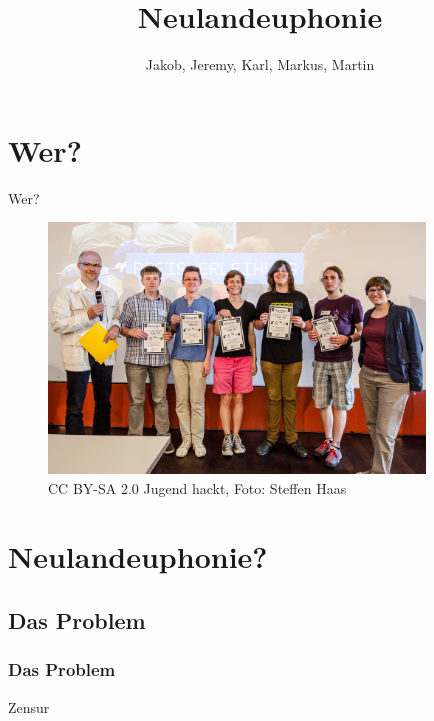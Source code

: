 \documentclass [xcolor=dvipsnames] {beamer}
\title {\sc Neulandeuphonie}
\author {Jakob, Jeremy, Karl, Markus, Martin}
\begin{document}
\begin{frame}
	\titlepage
\end{frame}

\begin{frame}
	\tableofcontents
\end{frame}

\section{Wer?}
\begin{frame}
	\begin{center}
		{\Huge Wer?}
	\end{center}
\end{frame}
\begin{frame}
	\begin{figure}
		\includegraphics[width=10cm]{jhost2015abschluss}
		\caption{CC BY-SA 2.0 Jugend hackt, Foto: Steffen Haas}
	\end{figure}
\end{frame}

\section{Neulandeuphonie?}
\subsection{Das Problem}
\begin{frame}
	\frametitle{\sc Das Problem}
	\begin{center}
		{\Huge Zensur}
	\end{center}
\end{frame}
\end{document}
